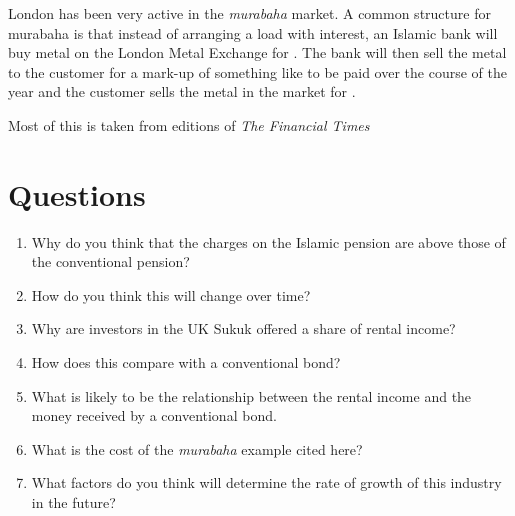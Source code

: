 \documentclass{article}\usepackage[]{graphicx}\usepackage[]{color}
\begin{document}
London has been very active in the \emph{murabaha} market.  A common structure for murabaha is that instead of arranging a  load with interest, an Islamic bank will buy metal on the London Metal Exchange for .  The bank will then sell the metal to the customer for a mark-up of something like  to be paid over the course of the year and the customer sells the metal in the market for . 

Most of this is taken from editions of \emph{The Financial Times}
\section*{Questions}
\begin{enumerate}
\item Why do you think that the charges on the Islamic pension are above those of the conventional pension?
\item How do you think this will change over time? 
\item Why are investors in the UK Sukuk offered a share of rental income?  
\item How does this compare with a conventional bond? 
\item What is likely to be the relationship between the rental income and the money received by a conventional bond. 
\item What is the cost of the \emph{murabaha} example cited here? 
\item What factors do you think will determine the rate of growth of this industry in the future? 
\end{enumerate}
\end{document}
